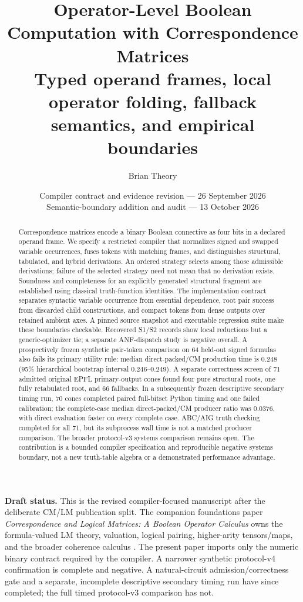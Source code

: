 \documentclass[10pt]{article}
\title{\vspace{-1.3em}\textbf{Operator-Level Boolean Computation with Correspondence Matrices}\\[0.35em]
\large Typed operand frames, local operator folding, fallback semantics, and empirical boundaries}
\author{Brian Theory}
\date{Compiler contract and evidence revision --- 26 September 2026\\Semantic-boundary addition and audit --- 13 October 2026}
\theoremstyle{plain}
\theoremstyle{definition}
\theoremstyle{remark}
\begin{document}
\maketitle

\begin{abstract}
Correspondence matrices encode a binary Boolean connective as four bits in a declared operand frame. We specify a restricted compiler that normalizes signed and swapped variable occurrences, fuses tokens with matching frames, and distinguishes structural, tabulated, and hybrid derivations. An ordered strategy selects among those admissible derivations; failure of the selected strategy need not mean that no derivation exists. Soundness and completeness for an explicitly generated structural fragment are established using classical truth-function identities. The implementation contract separates syntactic variable occurrence from essential dependence, root pair success from discarded child constructions, and compact tokens from dense outputs over retained ambient axes. A pinned source snapshot and executable regression suite make these boundaries checkable. Recovered S1/S2 records show local reductions but a generic-optimizer tie; a separate ANF-dispatch study is negative overall. A prospectively frozen synthetic pair-token comparison on 64 held-out signed formulas also fails its primary utility rule: median direct-packed/CM production time is 0.248 (95\% hierarchical bootstrap interval 0.246--0.249). A separate correctness screen of 71 admitted original EPFL primary-output cones found four pure structural roots, one fully retabulated root, and 66 fallbacks. In a subsequently frozen descriptive secondary timing run, 70 cones completed paired full-bitset Python timing and one failed calibration; the complete-case median direct-packed/CM producer ratio was 0.0376, with direct evaluation faster on every complete case. ABC/AIG truth checking completed for all 71, but its subprocess wall time is not a matched producer comparison. The broader protocol-v3 systems comparison remains open. The contribution is a bounded compiler specification and reproducible negative systems boundary, not a new truth-table algebra or a demonstrated performance advantage.

\end{abstract}

\noindent\textbf{Draft status.} This is the revised compiler-focused manuscript after the deliberate CM/LM publication split. The companion foundations paper \emph{Correspondence and Logical Matrices: A Boolean Operator Calculus} owns the formula-valued LM theory, valuation, logical pairing, higher-arity tensors/maps, and the broader coherence calculus \cite{TheoryFoundations2026}. The present paper imports only the numeric binary contract required by the compiler. A narrower synthetic protocol-v4 confirmation is complete and negative. A natural-circuit admission/correctness gate and a separate, incomplete descriptive secondary timing run have since completed; the full timed protocol-v3 comparison has not.
\end{document}
